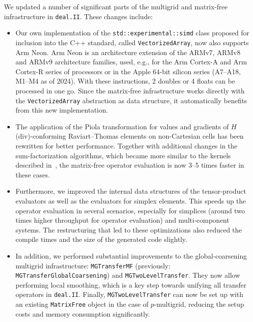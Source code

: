 \documentclass{ansarticle-preprint}
\newcommand{\specialword}[1]{\texttt{#1}}
\newcommand{\dealii}{{\specialword{deal.II}}\xspace}
\begin{document}
We updated a number of significant parts of the multigrid and matrix-free
infrastructure in \dealii. These changes include:
\begin{itemize}
\item Our own implementation of the \texttt{std::experimental::simd}
  class proposed for inclusion into the C++ standard, called
  \texttt{VectorizedArray}, now also supports Arm Neon. Arm Neon is an
  architecture extension of the ARMv7, ARMv8 and ARMv9 architecture families,
  used, e.g., for the Arm Cortex-A and Arm Cortex-R series of processors or in
  the Apple 64-bit silicon series (A7--A18, M1--M4 as of 2024).
  With these instructions, 2 doubles or 4 floats can be processed in one
  go. Since the matrix-free infrastructure works directly with the \texttt{VectorizedArray}
  abstraction as data structure, it automatically benefits from this new implementation.

\item The application of the Piola transformation for values and gradients of
  $H$(div)-conforming Raviart--Thomas elements on non-Cartesian cells has
  been rewritten for better performance. Together with additional changes in
  the sum-factorization algorithms, which became more similar to the kernels
  described in~\cite{KronbichlerKormann2019}, the matrix-free operator
  evaluation is now 3--5 times faster in these cases.

\item Furthermore, we improved the internal data structures of the tensor-product
  evaluators as well as the evaluators for simplex elements.  This speeds up
  the operator evaluation in several scenarios, especially for simplices
  (around two times higher throughput for operator evaluation) and
  multi-component systems. The restructuring that led to these optimizations
  also reduced the compile times and the size of the generated code slightly.

\item In addition, we performed substantial improvements to the global-coarsening
  multigrid infrastructure: \texttt{MGTransferMF} (previously:
  \texttt{MGTransferGlobalCoarsening}) and \texttt{MGTwoLevel\-Transfer}. They
  now allow performing local smoothing, which is a key step towards unifying
  all transfer operators in \dealii. Finally, \texttt{MGTwoLevelTransfer} can now
  be set up with an existing \texttt{MatrixFree} object in the case
  of $p$-multigrid, reducing the setup costs and memory consumption significantly.
\end{itemize}
\end{document}
